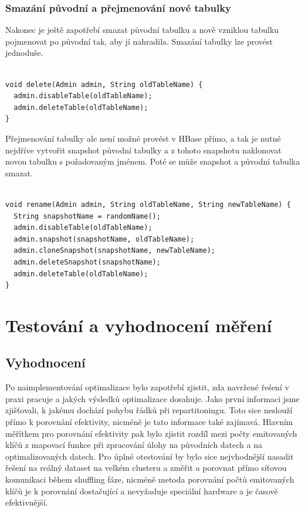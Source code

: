 \documentclass[thesis=M,czech]{FITthesis}[2012/06/26]
\begin{document}
\subsection{Smazání původní a přejmenování nové tabulky}
Nakonec je ještě zapotřebí smazat původní tabulku a nově vzniklou tabulku pojmenovat po původní tak, aby jí nahradila. Smazání tabulky lze provést jednoduše.
\begin{lstlisting}[frame=single]  % Start your code-block

void delete(Admin admin, String oldTableName) {
  admin.disableTable(oldTableName);
  admin.deleteTable(oldTableName);
}
\end{lstlisting}
 Přejmenování tabulky ale není možné provést v HBase přímo\cite{HBaseWEB}, a tak je nutné nejdříve vytvořit snapshot původní tabulky a z tohoto snapshotu naklonovat novou tabulku s požadovaným jménem. Poté se může snapshot a původní tabulka smazat.

\begin{lstlisting}[frame=single]  % Start your code-block

void rename(Admin admin, String oldTableName, String newTableName) {
  String snapshotName = randomName();
  admin.disableTable(oldTableName);
  admin.snapshot(snapshotName, oldTableName);
  admin.cloneSnapshot(snapshotName, newTableName);
  admin.deleteSnapshot(snapshotName);
  admin.deleteTable(oldTableName);
}
\end{lstlisting}


\chapter{Testování a vyhodnocení měření}
\section{Vyhodnocení}
Po naimplementování optimalizace bylo zapotřebí zjistit, zda navržené řešení v praxi pracuje a jakých výsledků optimalizace dosahuje. Jako první informaci jsme zjišťovali, k jakému dochází pohybu řádků při repartitoningu. Toto sice neslouží přímo k porovnání efektivity, nicméně je tato informace také zajímavá. Hlavním měřítkem pro porovnání efektivity pak bylo zjistit rozdíl mezi počty emitovaných klíčů z mapovací funkce při zpracování úlohy na původních datech a na optimalizovaných datech. Pro úplné otestování by bylo sice nejvhodnější nasadit řešení na reálný dataset na velkém clusteru a změřit a porovnat přímo síťovou komunikaci během shuffling fáze, nicméně metoda porovnání počtů emitovaných klíčů je k porovnání dostačující a nevyžaduje speciální hardware a je časově efektivnější. 
\end{document}

